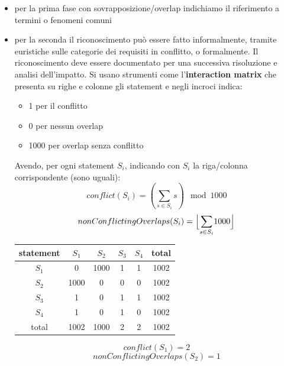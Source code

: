 \documentclass[a4paper,12pt, oneside]{book}
\begin{document}
\begin{itemize}
  \item per la prima fase con sovrapposizione/overlap indichiamo il riferimento
  a termini o fenomeni comuni 
  \item per la seconda il riconoscimento può essere fatto informalmente, tramite
  euristiche sulle categorie dei requisiti in conflitto, o
  formalmente. Il riconoscimento deve essere documentato per una successiva
  risoluzione e analisi dell'impatto. Si usano strumenti come
  l'\textbf{interaction matrix} che presenta su righe e colonne gli statement e
  negli incroci indica:
  \begin{itemize}
    \item 1 per il conflitto
    \item 0 per nessun overlap
    \item 1000 per overlap senza conflitto
  \end{itemize}
  Avendo, per ogni statement $S_i$, indicando con $S_i$ la riga/colonna
  corrispondente (sono uguali):
  \[conflict(S_i)= \left(\sum_{s\in S_i}s\right) \mod 1000\] 
  \[nonConflictingOverlaps(S_i)= \Bigl\lfloor{\sum_{s\in
        S_i}}{1000}\Bigr\rfloor\]
  \begin{esempio}
    \begin{table}[H]
      \centering
      \begin{tabular}{c||c|c|c|c|c}
        statement & $S_1$ & $S_2$ & $S_3$& $S_4$ & total\\
        \hline
        $S_1$ & 0 & 1000 & 1 & 1 & 1002\\
        $S_2$ & 1000 & 0 & 0 & 0 & 1002\\
        $S_3$ & 1 & 0 & 1 & 1 & 1002\\
        $S_4$ & 1 & 0 & 1 & 0 & 1002\\
        total & 1002 & 1000 & 2 & 2 & 1002\\
      \end{tabular}
    \end{table}
    \[conflict(S_1)=2\]
    \[nonConflictingOverlaps(S_2)=1\]
  \end{esempio}
 

\end{itemize}
\end{document}
